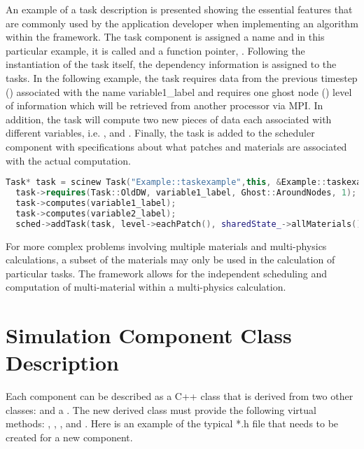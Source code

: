 An example of a task description is presented showing the essential
features that are commonly used by the application developer when
implementing an algorithm within the \Vaango framework.  The task
component is assigned a name and in this particular example, it is
called  and a function pointer,
.  Following the instantiation of the
task itself, the dependency information is assigned to the tasks.  In
the following example, the task requires data from the previous
timestep () associated with the name
variable1\_label and requires one ghost node
() level of information which will be
retrieved from another processor via MPI.  In addition, the task will
compute two new pieces of data each associated with different
variables, i.e. , and
.  Finally, the task is added to the scheduler
component with specifications about what patches and materials are
associated with the actual computation.

\begin{lstlisting}[language=Cpp]
  Task* task = scinew Task("Example::taskexample",this, &Example::taskexample);
  task->requires(Task::OldDW, variable1_label, Ghost::AroundNodes, 1);
  task->computes(variable1_label);
  task->computes(variable2_label);
  sched->addTask(task, level->eachPatch(), sharedState_->allMaterials());
\end{lstlisting}

For more complex problems involving multiple materials and
multi-physics calculations, a subset of the materials may only be used
in the calculation of particular tasks.  The \Vaango framework allows
for the independent scheduling and computation of multi-material
within a multi-physics calculation.

\section{Simulation Component Class Description}

Each \Vaango component can be described as a C++ class that is derived
from two other classes:  and a
. The new derived class must provide the
following virtual methods: ,
, ,
and .  Here is an example of the typical
*.h file that needs to be created for a new component.

